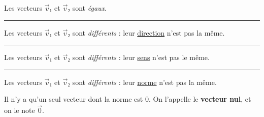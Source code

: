 \documentclass[
	classe=$2^{de}$,
	headerTitle=Généralités\space sur\space les\space vecteurs
]{coursclass}
\begin{document}
\begin{exemple}
	\begin{multicols}{2}

		\columnbreak

		Les vecteurs $\vec{v}₁$ et $\vec{v}₂$ sont \textit{égaux}.
	\end{multicols}
	\hrule

	\begin{multicols}{2}

		\columnbreak

		Les vecteurs $\vec{v}₁$ et $\vec{v}₂$ sont \textit{différents} : leur \uline{direction} n'est pas la même.
	\end{multicols}
	\hrule

	\begin{multicols}{2}

		\columnbreak

		Les vecteurs $\vec{v}₁$ et $\vec{v}₂$ sont \textit{différents} : leur \uline{sens} n'est pas le même.
	\end{multicols}
	\hrule

	\begin{multicols}{2}

		\columnbreak

		Les vecteurs $\vec{v}₁$ et $\vec{v}₂$ sont \textit{différents} : leur \uline{norme} n'est pas la même.
	\end{multicols}
\end{exemple}

\begin{definition}
	Il n'y a qu'un seul vecteur dont la norme est $0$. On l'appelle le \textbf{vecteur nul}, et on le note $\vec{0}$.
\end{definition}
\end{document}

